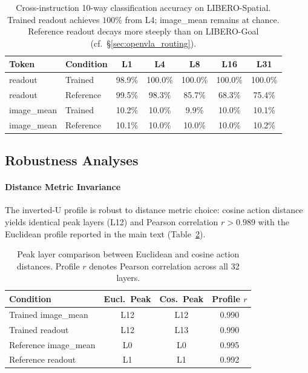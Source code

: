 \begin{table}[h]
\centering
\caption{Cross-instruction 10-way classification accuracy on LIBERO-Spatial. Trained readout achieves $100\%$ from L4; image\_mean remains at chance. Reference readout decays more steeply than on LIBERO-Goal (cf.\ \S\ref{sec:openvla_routing}).}
\label{tab:spatial_cross_instruction}
\small
\begin{tabular}{llccccc}
\toprule
\textbf{Token} & \textbf{Condition} & \textbf{L1} & \textbf{L4} & \textbf{L8} & \textbf{L16} & \textbf{L31} \\
\midrule
readout & Trained & 98.9\% & 100.0\% & 100.0\% & 100.0\% & 100.0\% \\
readout & Reference & 99.5\% & 98.3\% & 85.7\% & 68.3\% & 75.4\% \\
image\_mean & Trained & 10.2\% & 10.0\% & 9.9\% & 10.0\% & 10.1\% \\
image\_mean & Reference & 10.1\% & 10.0\% & 10.0\% & 10.0\% & 10.2\% \\
\bottomrule
\end{tabular}
\end{table}

\subsection{Robustness Analyses}
\paragraph{Distance Metric Invariance}
The inverted-U profile is robust to distance metric choice: cosine action distance yields identical peak layers (L12) and Pearson correlation $r > 0.989$ with the Euclidean profile reported in the main text (Table~\ref{tab:metric_invariance}).

\begin{table}[h]
\centering
\caption{Peak layer comparison between Euclidean and cosine action distances. Profile $r$ denotes Pearson correlation across all 32 layers.}
\label{tab:metric_invariance}
\small
\begin{tabular}{lccc}
\toprule
\textbf{Condition} & \textbf{Eucl.\ Peak} & \textbf{Cos.\ Peak} & \textbf{Profile $r$} \\
\midrule
Trained image\_mean & L12 & L12 & 0.990 \\
Trained readout & L12 & L13 & 0.990 \\
Reference image\_mean & L0 & L0 & 0.995 \\
Reference readout & L1 & L1 & 0.992 \\
\bottomrule
\end{tabular}
\end{table}

